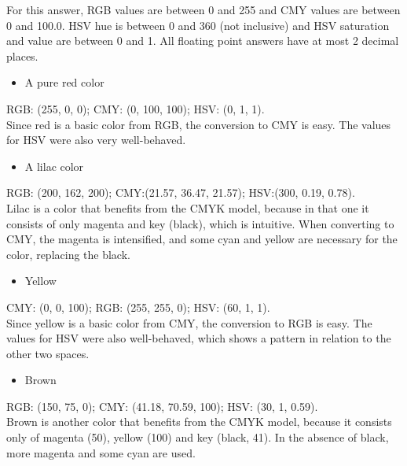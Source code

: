 \documentclass[12pt]{article}
\begin{document}
For this answer, RGB values are between 0 and 255 and CMY values are between 0 and 100.0. HSV hue is between 0 and 360 (not inclusive) and HSV saturation and value are between 0 and 1. All floating point answers have at most 2 decimal places.

\begin{itemize}
\item A pure red color
\end{itemize}
RGB: (255, 0, 0); \hspace{1cm} CMY: (0, 100, 100); \hspace{1cm} HSV: (0, 1, 1).\\
Since red is a basic color from RGB, the conversion to CMY is easy. The values for HSV were also very well-behaved.

\begin{itemize}
\item  A lilac color
\end{itemize}
RGB: (200, 162, 200); \hspace{1cm} CMY:(21.57, 36.47, 21.57); \hspace{1cm} HSV:(300, 0.19, 0.78).\\
Lilac is a color that benefits from the CMYK model, because in that one it consists of only magenta and key (black), which is intuitive. When converting to CMY, the magenta is intensified, and some cyan and yellow are necessary for the color, replacing the black.

\begin{itemize}
\item  Yellow
\end{itemize}
CMY: (0, 0, 100); \hspace{1cm} RGB: (255, 255, 0); \hspace{1cm} HSV: (60, 1, 1).\\
Since yellow is a basic color from CMY, the conversion to RGB is easy. The values for HSV were also well-behaved, which shows a pattern in relation to the other two spaces.

\begin{itemize}
\item  Brown
\end{itemize}
RGB: (150, 75, 0); \hspace{1cm} CMY: (41.18, 70.59, 100); \hspace{1cm} HSV: (30, 1, 0.59).\\
Brown is another color that benefits from the CMYK model, because it consists only of magenta (50), yellow (100) and key (black, 41). In the absence of black, more magenta and some cyan are used.
\end{document}
